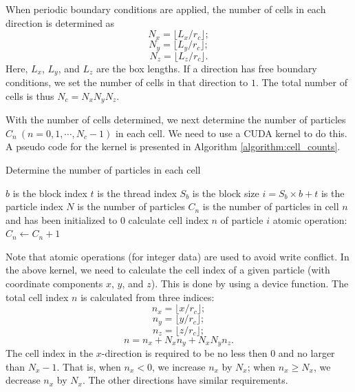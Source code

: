 \documentclass[12pt,a4paper]{report}
\begin{document}
When periodic boundary conditions are applied, the number of cells in each direction is determined as
\begin{equation}
N_{x} = \lfloor L_x / r_c \rfloor;
\end{equation}
\begin{equation}
N_{y} = \lfloor L_y / r_c \rfloor;
\end{equation}
\begin{equation}
N_{z} = \lfloor L_z / r_c \rfloor.
\end{equation}
Here, $L_x$, $L_y$, and $L_z$ are the box lengths.
If a direction has free boundary conditions, we set the number of cells in that direction to $1$. The total number of cells is thus $N_c = N_x N_y N_z$.

With the number of cells determined, we next determine the number of particles $C_n ~(n=0, 1, \cdots, N_c-1)$ in each cell. We need to use a CUDA kernel to do this. A pseudo code for the kernel is presented in Algorithm  \ref{algorithm:cell_counts}.


\begin{algorithm}[htbp]
\caption{Determine the number of particles in each cell}
\label{algorithm:cell_counts}
\begin{algorithmic}[1]
\Require $b$ is the block index
\Require $t$ is the thread index
\Require $S_b$ is the block size
\Require $i=S_b\times b+t$ is the particle index
\Require $N$ is the number of particles
\Require $C_n$ is the number of particles in cell $n$ and has been initialized to 0
	\State calculate cell index $n$ of particle $i$
	\State atomic operation: $C_n \leftarrow C_n +1$
\EndIf
 \end{algorithmic}
\end{algorithm}

Note that atomic operations (for integer data) are used to avoid write conflict. In the above kernel, we need to calculate the cell index of a given particle (with coordinate components $x$, $y$, and $z$). This is done by using a device function. The total cell index $n$ is calculated from three indices:
\begin{equation}
n_x = \lfloor x / r_c \rfloor;
\end{equation}
\begin{equation}
n_y = \lfloor y / r_c \rfloor;
\end{equation}
\begin{equation}
n_z = \lfloor z / r_c \rfloor;
\end{equation}
\begin{equation}
n = n_x + N_x n_y + N_x N_y n_z.
\end{equation}
The cell index in the $x$-direction is required to be no less then 0 and no larger than $N_x-1$. That is, when $n_x < 0$, we increase $n_x$ by $N_x$; when $n_x \geq N_x$, we decrease $n_x$ by $N_x$. The other directions have similar requirements.
\end{document}

